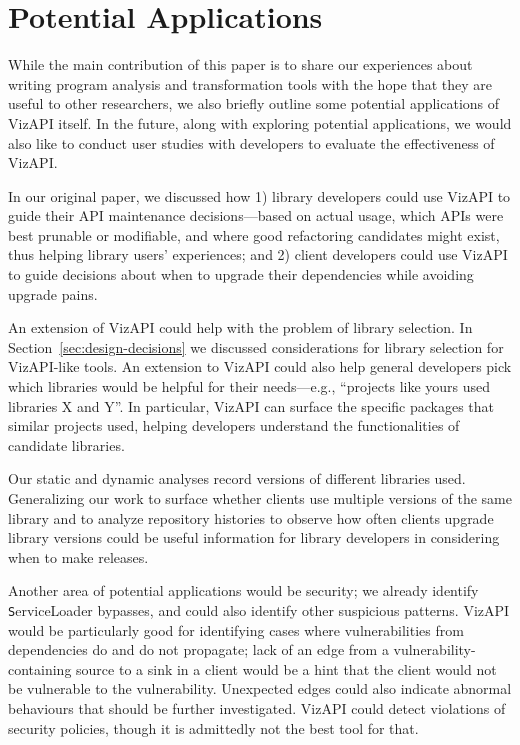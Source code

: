 \section{Potential Applications}
\label{sec:potential-applications}
While the main contribution of this paper is to share our experiences
about writing program analysis and transformation tools with the hope
that they are useful to other researchers, we also briefly outline
some potential applications of VizAPI itself. In the future, along
with exploring potential applications, we would also like to conduct
user studies with developers to evaluate the effectiveness of
VizAPI.

In our original paper, we discussed how 1) library developers could
use VizAPI to guide their API maintenance decisions---based on actual
usage, which APIs were best prunable or modifiable, and where good
refactoring candidates might exist, thus helping library users'
experiences; and 2) client developers could use VizAPI to guide
decisions about when to upgrade their dependencies while avoiding
upgrade pains.

An extension of VizAPI could help with the problem of library selection. In
Section~\ref{sec:design-decisions} we discussed considerations for library
selection for VizAPI-like tools. An extension to VizAPI could also help
general developers pick which libraries would be helpful for their
needs---e.g., ``projects like yours used libraries X and Y''. In particular,
VizAPI can surface the specific packages that similar projects used,
helping developers understand the functionalities of candidate libraries.

Our static and dynamic analyses record versions of different libraries used. 
Generalizing our work to surface whether clients use multiple versions of the same library and
to analyze repository histories to observe how often clients upgrade library versions 
could be useful information for library developers in considering when to make releases.

Another area of potential applications would be security; we already
identify {\texttt ServiceLoader} bypasses, and could also identify
other suspicious patterns. VizAPI would be particularly good for
identifying cases where vulnerabilities from dependencies do and do
not propagate; lack of an edge from a vulnerability-containing source
to a sink in a client would be a hint that the client would not be
vulnerable to the vulnerability. Unexpected edges could also indicate
abnormal behaviours that should be further investigated.
VizAPI could detect violations of
security policies, though it is admittedly not the best tool for that.

